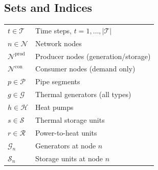 \documentclass[review,3p]{elsarticle}
\begin{document}
\subsection*{Sets and Indices}
\begin{tabular}{@{}p{2.8cm}p{9.5cm}@{}}
$t \in \mathcal{T}$               & Time steps, $t = 1, \ldots, |\mathcal{T}|$ \\
$n \in \mathcal{N}$               & Network nodes \\
$\mathcal{N}^{\mathrm{prod}}$     & Producer nodes (generation/storage) \\
$\mathcal{N}^{\mathrm{con}}$      & Consumer nodes (demand only) \\
$p \in \mathcal{P}$               & Pipe segments \\
$g \in \mathcal{G}$               & Thermal generators (all types) \\
$h \in \mathcal{H}$               & Heat pumps \\
$s \in \mathcal{S}$               & Thermal storage units \\
$r \in \mathcal{R}$               & Power-to-heat units \\
$\mathcal{G}_n$                   & Generators at node $n$ \\
$\mathcal{S}_n$                   & Storage units at node $n$ \\
\end{tabular}
\end{document}
